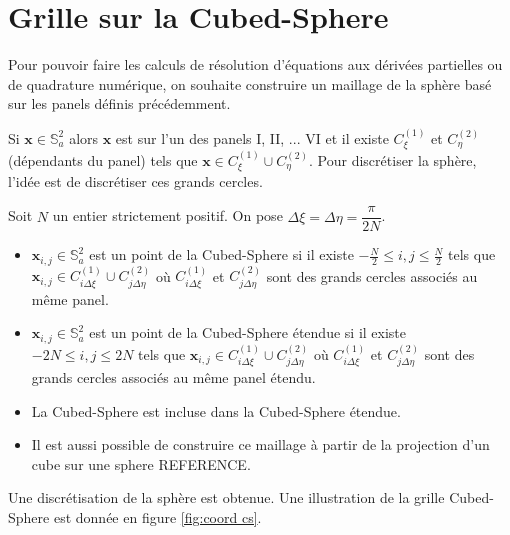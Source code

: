 \section{Grille sur la Cubed-Sphere}

Pour pouvoir faire les calculs de résolution d'équations aux dérivées partielles ou de quadrature numérique, on souhaite construire un maillage de la sphère basé sur les panels définis précédemment.

Si $\mathbf{x} \in \mathbb{S}_a^2$ alors $\mathbf{x}$ est sur l'un des panels I, II, ... VI et il existe $C_{\xi}^{(1)}$ et $C_{\eta}^{(2)}$ (dépendants du panel) tels que $\mathbf{x} \in C_{\xi}^{(1)} \cup C_{\eta}^{(2)}$. Pour discrétiser la sphère, l'idée est de discrétiser ces grands cercles.

\begin{definition}
Soit $N$ un entier strictement positif. On pose $\Delta \xi = \Delta \eta = \dfrac{\pi}{2N}$.
\begin{itemize}
\item $\mathbf{x}_{i,j} \in \mathbb{S}_a^2$ est un point de la Cubed-Sphere si il existe $-\frac{N}{2} \leq i,j \leq \frac{N}{2}$ tels que $\mathbf{x}_{i,j} \in C_{i \Delta \xi}^{(1)} \cup C_{j \Delta \eta}^{(2)}$ où $C_{i \Delta \xi}^{(1)}$ et $C_{j \Delta \eta}^{(2)}$ sont des grands cercles associés au même panel.

\item $\mathbf{x}_{i,j} \in \mathbb{S}_a^2$ est un point de la Cubed-Sphere étendue si il existe $-2N \leq i,j \leq 2N$ tels que $\mathbf{x}_{i,j} \in C_{i \Delta \xi}^(1) \cup C_{j \Delta \eta}^(2)$ où $C_{i \Delta \xi}^{(1)}$ et $C_{j \Delta \eta}^{(2)}$ sont des grands cercles associés au même panel étendu.
\end{itemize}
\end{definition}

\begin{remarque}
\begin{itemize}
\item La Cubed-Sphere est incluse dans la Cubed-Sphere étendue.
\item Il est aussi possible de construire ce maillage à partir de la projection d'un cube sur une sphere REFERENCE.
\end{itemize}
\end{remarque}

Une discrétisation de la sphère est obtenue. Une illustration de la grille Cubed-Sphere est donnée en figure \ref{fig:coord cs}.

